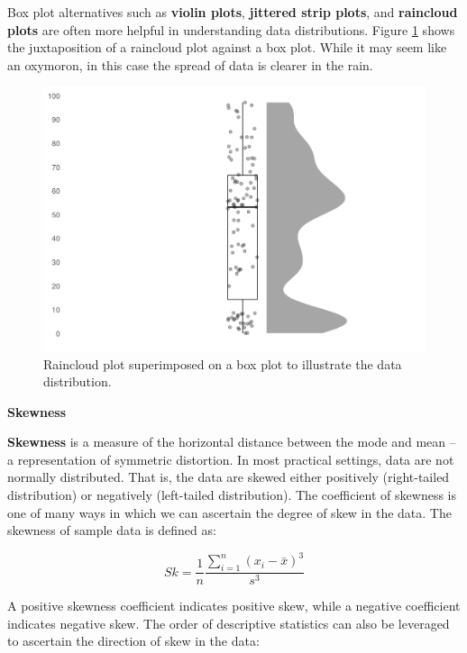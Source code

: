 \documentclass[
]{book}
\begin{document}
Box plot alternatives such as \textbf{violin plots}, \textbf{jittered strip plots}, and \textbf{raincloud plots} are often more helpful in understanding data distributions. Figure \ref{fig:boxplot-alt} shows the juxtaposition of a raincloud plot against a box plot. While it may seem like an oxymoron, in this case the spread of data is clearer in the rain.

\begin{figure}

{\centering \includegraphics[width=1\linewidth]{The_Fundamentals_of_People_Analytics_files/figure-latex/boxplot-alt-1} 

}

\caption{Raincloud plot superimposed on a box plot to illustrate the data distribution.}\label{fig:boxplot-alt}
\end{figure}

\textbf{Skewness}

\textbf{Skewness} is a measure of the horizontal distance between the mode and mean -- a representation of symmetric distortion. In most practical settings, data are not normally distributed. That is, the data are skewed either positively (right-tailed distribution) or negatively (left-tailed distribution). The coefficient of skewness is one of many ways in which we can ascertain the degree of skew in the data. The skewness of sample data is defined as:

\[ Sk = \frac{1}{n} \frac{\displaystyle\sum_{i=1}^{n} (x_i-\bar{x})^3}{s^3} \]

A positive skewness coefficient indicates positive skew, while a negative coefficient indicates negative skew. The order of descriptive statistics can also be leveraged to ascertain the direction of skew in the data:
\end{document}
